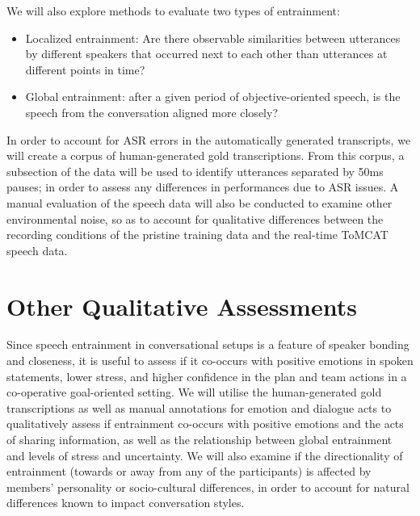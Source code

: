     We will also explore methods to evaluate two types of entrainment:

    \begin{itemize}
        \item Localized entrainment: Are there observable similarities between utterances by different speakers that occurred next to each other than utterances at different points in time?
        \item Global entrainment: after a given period of objective-oriented speech, is the speech from the conversation aligned more closely? 
    \end{itemize}

    In order to account for ASR errors in the automatically generated transcripts, we will create a corpus of human-generated gold transcriptions. From this corpus, a subsection of the data will be used to identify utterances separated by 50ms pauses; in order to assess any differences in performances due to ASR issues. A manual evaluation of the speech data will also be conducted to examine other environmental noise, so as to account for qualitative differences between the recording conditions of the pristine training data and the real-time ToMCAT speech data. 

   \section{Other Qualitative Assessments}

   Since speech entrainment in conversational setups is a feature of speaker bonding and closeness, it is useful to assess if it co-occurs with positive emotions in spoken statements, lower stress, and higher confidence in the plan and team actions in a co-operative goal-oriented setting. We will utilise the human-generated gold transcriptions as well as manual annotations for emotion and dialogue acts to qualitatively assess if entrainment co-occurs with positive emotions and the acts of sharing information, as well as the relationship between global entrainment and levels of stress and uncertainty. We will also examine if the directionality of entrainment (towards or away from any of the participants) is affected by members' personality or socio-cultural differences, in order to account for natural differences known to impact conversation styles.

